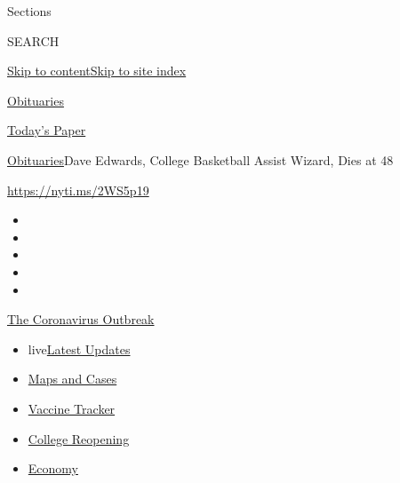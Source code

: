 Sections

SEARCH

\protect\hyperlink{site-content}{Skip to
content}\protect\hyperlink{site-index}{Skip to site index}

\href{https://www.nytimes.com/section/obituaries}{Obituaries}

\href{https://myaccount.nytimes.com/auth/login?response_type=cookie\&client_id=vi}{}

\href{https://www.nytimes.com/section/todayspaper}{Today's Paper}

\href{/section/obituaries}{Obituaries}\textbar{}Dave Edwards, College
Basketball Assist Wizard, Dies at 48

\url{https://nyti.ms/2WS5p19}

\begin{itemize}
\item
\item
\item
\item
\item
\end{itemize}

\href{https://www.nytimes.com/news-event/coronavirus?action=click\&pgtype=Article\&state=default\&region=TOP_BANNER\&context=storylines_menu}{The
Coronavirus Outbreak}

\begin{itemize}
\tightlist
\item
  live\href{https://www.nytimes.com/2020/08/03/world/coronavirus-covid-19.html?action=click\&pgtype=Article\&state=default\&region=TOP_BANNER\&context=storylines_menu}{Latest
  Updates}
\item
  \href{https://www.nytimes.com/interactive/2020/us/coronavirus-us-cases.html?action=click\&pgtype=Article\&state=default\&region=TOP_BANNER\&context=storylines_menu}{Maps
  and Cases}
\item
  \href{https://www.nytimes.com/interactive/2020/science/coronavirus-vaccine-tracker.html?action=click\&pgtype=Article\&state=default\&region=TOP_BANNER\&context=storylines_menu}{Vaccine
  Tracker}
\item
  \href{https://www.nytimes.com/2020/08/02/us/covid-college-reopening.html?action=click\&pgtype=Article\&state=default\&region=TOP_BANNER\&context=storylines_menu}{College
  Reopening}
\item
  \href{https://www.nytimes.com/live/2020/08/03/business/stock-market-today-coronavirus?action=click\&pgtype=Article\&state=default\&region=TOP_BANNER\&context=storylines_menu}{Economy}
\end{itemize}

